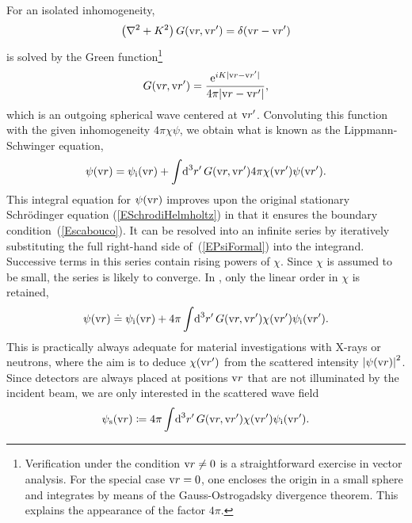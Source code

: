 For an isolated inhomogeneity,
\begin{equation}\label{EHelmholtzForGreen}
  \left(\mathbf{\nabla}^2+K^2\right)G(\text{v}{r},\text{v}{r}') = \delta(\text{v}{r}-\text{v}{r}')
\end{equation}
%
%
is solved by the Green function\footnote
{Verification under the condition $\text{v}{r}\ne0$
is a straightforward exercise in vector analysis.
For the special case $\text{v}{r}=0$,
one encloses the origin in a small sphere
and integrates by means of the Gauss-Ostrogadsky divergence theorem.
This explains the appearance of the factor $4\pi$.}
\begin{equation}\label{EGreens1}
  G(\text{v}{r},\text{v}{r}') = \frac{\text{e}^{iK|\text{v}{r}-\text{v}{r}'|}}{4\pi |\text{v}{r}-\text{v}{r}'|},
\end{equation}
which is an outgoing spherical wave centered at $\text{v}{r}'$.
Convoluting this function with the given inhomogeneity $4\pi\chi\psi$,
we obtain what is known as the Lippmann-Schwinger equation,
\begin{equation}\label{EPsiFormal}
  \psi(\text{v}{r})
  = \psi_{\text{i}}(\text{v}{r})
  + \int\!\text{d}^3r'\, G(\text{v}{r},\text{v}{r}') 4\pi\chi(\text{v}{r}')\psi(\text{v}{r}').
\end{equation}
This integral equation for $\psi(\text{v}{r})$ improves
upon the original stationary Schrödinger equation (\ref{ESchrodiHelmholtz})
in that it ensures the boundary condition~(\ref{Escabouco}).
It can be resolved into an infinite series
by iteratively substituting the full right-hand side of~(\ref{EPsiFormal})
into the integrand.
Successive terms in this series contain rising powers of $\chi$.
Since $\chi$ is assumed to be small, the series is likely to converge.
In ,
only the linear order in $\chi$ is retained,
\begin{equation}\label{EBorn}
  \psi(\text{v}{r})
  \doteq \psi_{\text{i}}(\text{v}{r})
  + 4\pi \int\!\text{d}^3r'\, G(\text{v}{r},\text{v}{r}') \chi(\text{v}{r}') \psi_{\text{i}}(\text{v}{r}').
\end{equation}
This is practically always adequate for
material investigations with X-rays or neutrons,
where the aim is to 
deduce $\chi(\text{v}{r}')$ from the scattered intensity ${|\psi(\text{v}{r})|}^2$.
Since detectors are always placed at positions $\text{v}{r}$
that are not illuminated by the incident beam,
we are only interested in the scattered wave field
\begin{equation}\label{EBornS}
  \psi_\text{s}(\text{v}{r})
  \coloneqq 
  4\pi \int\!\text{d}^3r'\, G(\text{v}{r},\text{v}{r}') \chi(\text{v}{r}') \psi_{\text{i}}(\text{v}{r}').
\end{equation}
%
%

